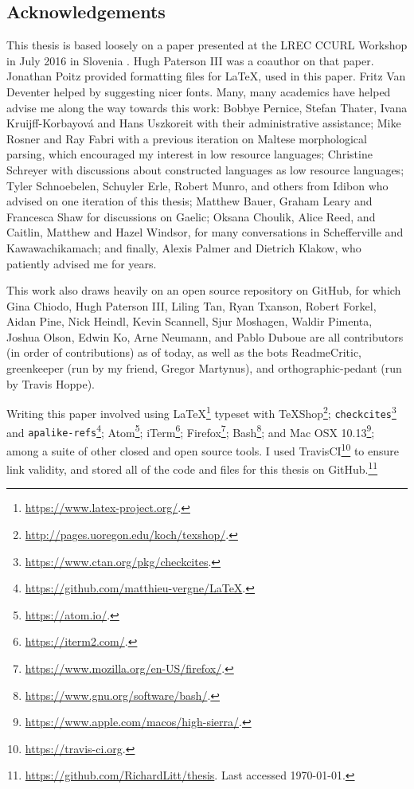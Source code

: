 \newpage
\noindent\subsection*{Acknowledgements}

This thesis is based loosely on a paper presented at the LREC CCURL Workshop in July 2016 in Slovenia \citep{CCURL}. Hugh Paterson III was a coauthor on that paper. Jonathan Poitz provided formatting files for \LaTeX, used in this paper. Fritz Van Deventer helped by suggesting nicer fonts. Many, many academics have helped advise me along the way towards this work: Bobbye Pernice, Stefan Thater, Ivana Kruijff-Korbayov\'a and Hans Uszkoreit with their administrative assistance; Mike Rosner and Ray Fabri with a previous iteration on Maltese morphological parsing, which encouraged my interest in low resource languages; Christine Schreyer with discussions about constructed languages as low resource languages; Tyler Schnoebelen, Schuyler Erle, Robert Munro, and others from Idibon who advised on one iteration of this thesis; Matthew Bauer, Graham Leary and Francesca Shaw for discussions on Gaelic; Oksana Choulik, Alice Reed, and Caitlin, Matthew and Hazel Windsor, for many conversations in Schefferville and Kawawachikamach; and finally, Alexis Palmer and Dietrich Klakow, who patiently advised me for years.

This work also draws heavily on an open source repository on GitHub, for which Gina Chiodo, Hugh Paterson III, Liling Tan, Ryan Txanson, Robert Forkel, Aidan Pine, Nick Heindl, Kevin Scannell, Sjur Moshagen, Waldir Pimenta, Joshua Olson, Edwin Ko, Arne Neumann, and Pablo Duboue are all contributors (in order of contributions) as of today, as well as the bots ReadmeCritic, greenkeeper (run by my friend, Gregor Martynus), and orthographic-pedant (run by Travis Hoppe).

Writing this paper involved using LaTeX\footnote{\href{https://www.latex-project.org/}{https://www.latex-project.org/}. } typeset with TeXShop\footnote{\href{http://pages.uoregon.edu/koch/texshop/}{http://pages.uoregon.edu/koch/texshop/}. };
{\tt checkcites}\footnote{\href{https://www.ctan.org/pkg/checkcites}{https://www.ctan.org/pkg/checkcites}. } and {\tt apalike-refs}\footnote{\href{https://github.com/matthieu-vergne/LaTeX}{https://github.com/matthieu-vergne/LaTeX}. }; Atom\footnote{\href{https://atom.io/}{https://atom.io/}. }; iTerm\footnote{\href{https://iterm2.com/}{https://iterm2.com/}. }; Firefox\footnote{\href{https://www.mozilla.org/en-US/firefox/}{https://www.mozilla.org/en-US/firefox/}. }; Bash\footnote{\href{https://www.gnu.org/software/bash/}{https://www.gnu.org/software/bash/}. }; and Mac OSX 10.13\footnote{\href{https://www.apple.com/macos/high-sierra/}{https://www.apple.com/macos/high-sierra/}. }; among a suite of other closed and open source tools. I used TravisCI\footnote{\href{https://travis-ci.org}{https://travis-ci.org}. } to ensure link validity, and stored all of the code and files for this thesis on GitHub.\footnote{\href{https://github.com/RichardLitt/thesis}{https://github.com/RichardLitt/thesis}. Last accessed \today.}

